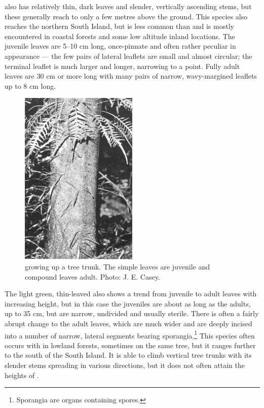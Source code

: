  also has relatively thin, dark leaves and slender, vertically ascending stems, but these generally reach to only a few metres above the ground.
This species also reaches the northern South Island, but is less common than  and is mostly encountered in coastal forests and some low altitude inland locations.
The juvenile leaves are 5--10 cm long, once-pinnate and often rather peculiar in appearance --- the few pairs of lateral leaflets are small and almost circular; the terminal leaflet is much larger and longer, narrowing to a point.
Fully adult leaves are 30 cm or more long with many pairs of narrow, wavy-margined leaflets up to 8 cm long.

\begin{figure}
	\includegraphics[width=0.5\textwidth]{graphics/figure29scandens.jpg}
	\centering
	\caption[Phymatosorus scandens growing up a tree trunk]{ growing up a tree trunk.
The simple leaves are juvenile and compound leaves adult.
	Photo: J. E. Casey.}%
	\label{fig:29scandens}
\end{figure}

The light green, thin-leaved  also shows a trend from juvenile to adult leaves with increasing height, but in this case the juveniles are about as long as the adults, up to 35 cm, but are narrow, undivided and usually sterile.
There is often a fairly abrupt change to the adult leaves, which are much wider and are deeply incised into a number of narrow, lateral segments bearing sporangia.\footnote{Sporangia are organs containing spores.}
This species often occurs with  in lowland forests, sometimes on the same tree, but it ranges further to the south of the South Island.
It is able to climb vertical tree trunks with its slender stems spreading in various directions, but it does not often attain the heights of .


